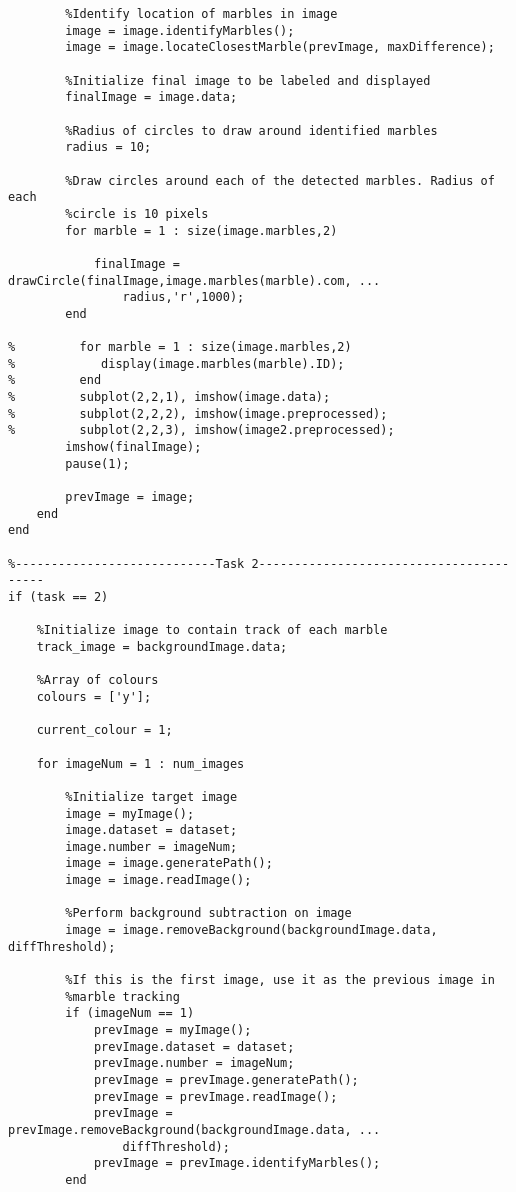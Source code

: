 \documentclass[10pt,a4paper,onecolumn]{report}
\begin{document}
\begin{lstlisting}
        %Identify location of marbles in image
        image = image.identifyMarbles();
        image = image.locateClosestMarble(prevImage, maxDifference);

        %Initialize final image to be labeled and displayed
        finalImage = image.data;

        %Radius of circles to draw around identified marbles
        radius = 10;

        %Draw circles around each of the detected marbles. Radius of each 
        %circle is 10 pixels
        for marble = 1 : size(image.marbles,2)
            
            finalImage = drawCircle(finalImage,image.marbles(marble).com, ...
                radius,'r',1000);
        end

%         for marble = 1 : size(image.marbles,2)
%            display(image.marbles(marble).ID);
%         end
%         subplot(2,2,1), imshow(image.data);
%         subplot(2,2,2), imshow(image.preprocessed);
%         subplot(2,2,3), imshow(image2.preprocessed);
        imshow(finalImage);
        pause(1);
        
        prevImage = image;
    end
end
    
%----------------------------Task 2----------------------------------------
if (task == 2)
    
    %Initialize image to contain track of each marble
    track_image = backgroundImage.data;
    
    %Array of colours
    colours = ['y'];
    
    current_colour = 1;
    
    for imageNum = 1 : num_images
        
        %Initialize target image
        image = myImage();
        image.dataset = dataset;
        image.number = imageNum;
        image = image.generatePath();
        image = image.readImage();

        %Perform background subtraction on image
        image = image.removeBackground(backgroundImage.data, diffThreshold);
        
        %If this is the first image, use it as the previous image in
        %marble tracking
        if (imageNum == 1)
            prevImage = myImage();
            prevImage.dataset = dataset;
            prevImage.number = imageNum;
            prevImage = prevImage.generatePath();
            prevImage = prevImage.readImage();
            prevImage = prevImage.removeBackground(backgroundImage.data, ...
                diffThreshold);
            prevImage = prevImage.identifyMarbles();
        end 
        

\end{lstlisting}
\end{document}

